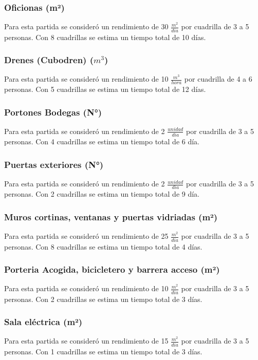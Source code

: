 \documentclass{article} %
\begin{document}
\subsubsection{Oficionas (m²)}
Para esta partida se consideró un rendimiento de 30 $\frac{m^2}{dia}$ por cuadrilla de 3 a 5 personas. Con 8 cuadrillas se estima un tiempo total de 10 días.

\subsubsection{Drenes (Cubodren) ($m^3$)}
Para esta partida se consideró un rendimiento de 10 $\frac{m^3}{hora}$ por cuadrilla de 4 a 6 personas. Con 5 cuadrillas se estima un tiempo total de 12 días.

\subsubsection{Portones Bodegas (N°)}
Para esta partida se consideró un rendimiento de 2 $\frac{unidad}{dia}$ por cuadrilla de 3 a 5 personas. Con 4 cuadrillas se estima un tiempo total de 6 día.

\subsubsection{Puertas exteriores (N°)}
Para esta partida se consideró un rendimiento de 2 $\frac{unidad}{dia}$ por cuadrilla de 3 a 5 personas. Con 2 cuadrillas se estima un tiempo total de 9 día.

\subsubsection{Muros cortinas, ventanas y puertas vidriadas (m²)}
Para esta partida se consideró un rendimiento de 25 $\frac{m^2}{dia}$ por cuadrilla de 3 a 5 personas. Con 8 cuadrillas se estima un tiempo total de 4 días.

\subsubsection{Porteria Acogida, bicicletero y barrera acceso (m²)}
Para esta partida se consideró un rendimiento de 10 $\frac{m^2}{dia}$ por cuadrilla de 3 a 5 personas. Con 2 cuadrillas se estima un tiempo total de 3 días.

\subsubsection{Sala eléctrica (m²)}
Para esta partida se consideró un rendimiento de 15 $\frac{m^2}{dia}$ por cuadrilla de 3 a 5 personas. Con 1 cuadrillas se estima un tiempo total de 3 días.
\end{document}
